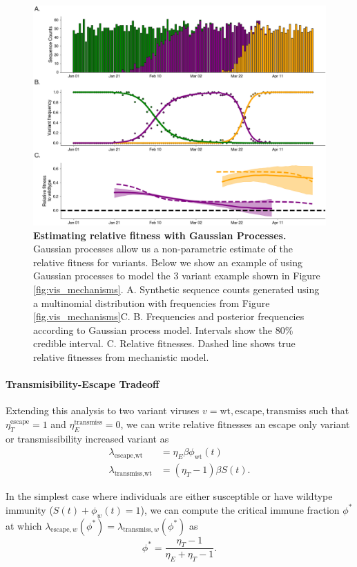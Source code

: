 \documentclass[12pt,oneside,letterpaper]{article}
\newcommand{\wt}{\text{wt}}
\newcommand{\varE}{\text{escape}}
\newcommand{\varT}{\text{transmiss}}
\begin{document}
\begin{figure}[h]
    \centering
    \includegraphics[width=0.8\linewidth]{./figures/gp_example.png}
    \caption{\textbf{Estimating relative fitness with Gaussian Processes.}
    Gaussian processes allow us a non-parametric estimate of the relative fitness for variants.
    Below we show an example of using Gaussian processes to model the 3 variant example shown in Figure \ref{fig:vis_mechanisms}.
    A. Synthetic sequence counts generated using a multinomial distribution with frequencies from Figure \ref{fig.vis_mechanisms}C.
    B. Frequencies and posterior frequencies according to Gaussian process model. Intervals show the 80\% credible interval.
    C. Relative fitnesses. Dashed line shows true relative fitnesses from mechanistic model.
}
    \label{fig:gp_example}
\end{figure}


\paragraph{Transmisibility-Escape Tradeoff}%

Extending this analysis to two variant viruses $v= \wt, \varE, \varT$ such that $\eta_{T}^{\varE} = 1$ and $\eta_{E}^{\varT} = 0$, we can write relative fitnesses an escape only variant or transmissibility increased variant as
\begin{align*}
    \lambda_{\varE, \wt} &= \eta_{E} \beta \phi_{\wt}(t)\\
    \lambda_{\varT, \wt} &= (\eta_{T} - 1) \beta S(t).
\end{align*}

In the simplest case where individuals are either susceptible or have wildtype immunity ($S(t) + \phi_{w}(t) = 1$), we can compute the critical immune fraction $\phi^{*}$ at which $\lambda_{\varE, w}(\phi^{*}) = \lambda_{\varT, w}(\phi^{*})$ as
\begin{equation} \label{eq:critical_immunity}
    \phi^{*} = \frac{\eta_{T} - 1}{\eta_{E} + \eta_{T} - 1}.
\end{equation}
\end{document}
